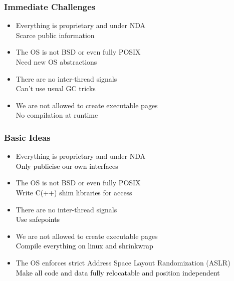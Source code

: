 \documentclass[14pt,t,aspectratio=169]{beamer}
\begin{document}
\begin{frame}
  \frametitle{Immediate Challenges}
  \begin{itemize}
  \item Everything is proprietary and under NDA \\
    \Rightarrow{} Scarce public information
  \item The OS is not BSD or even fully POSIX \\
    \Rightarrow{} Need new OS abstractions
  \item There are no inter-thread signals \\
    \Rightarrow{} Can't use usual GC tricks
  \item We are not allowed to create executable pages \\
    \Rightarrow{} No compilation at runtime
  \end{itemize}
\end{frame}

\begin{frame}
  \frametitle{Basic Ideas}
  \begin{itemize}
    \color{lightgray}
  \item Everything is proprietary and under NDA \\
    \textcolor{red}{\Rightarrow} \textcolor{black}{Only publicise our own interfaces}
  \item The OS is not BSD or even fully POSIX \\
    \textcolor{red}{\Rightarrow} \textcolor{black}{Write C(++) shim libraries for access}
  \item There are no inter-thread signals \\
    \textcolor{red}{\Rightarrow} \textcolor{black}{Use safepoints}
  \item We are not allowed to create executable pages \\
    \textcolor{red}{\Rightarrow} \textcolor{black}{Compile everything on linux
      and shrinkwrap}
  \item The OS enforces strict Address Space Layout Randomization (ASLR) \\
    \textcolor{red}{\Rightarrow} \textcolor{black}{Make all code and data fully
      relocatable and position independent}
  \end{itemize}
\end{frame}
\end{document}
